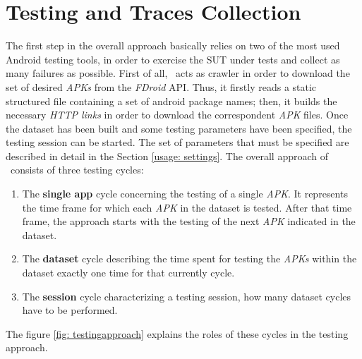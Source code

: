 \section{Testing and Traces Collection}
\label{approach:testing}
The first step in the overall approach basically relies on two of the most used Android testing tools, in order to exercise the SUT under tests and collect as many failures as possible. 
First of all, \toolname\ acts as crawler in order to download the set of desired \textit{APKs} from the \textit{FDroid} API. 
Thus, it firstly reads a static structured file containing a set of android package names; then, it builds the necessary \textit{HTTP links} in order to download the correspondent \textit{APK} files. 
Once the dataset has been built and some testing parameters have been specified, the testing session can be started. 
The set of parameters that must be specified are described in detail in the Section \ref{usage: settings}.
The overall approach of \toolname\ consists of three testing cycles: 
\begin{enumerate}
\item 
The \textbf{single app} cycle concerning the testing of a single \textit{APK}. It represents the time frame for which each \textit{APK} in the dataset is tested. After that time frame, the approach starts with the testing of the next \textit{APK} indicated in the dataset. 
\item The \textbf{dataset} cycle describing the time spent for testing the \textit{APKs} within the dataset exactly one time for that currently cycle. 
\item The \textbf{session} cycle characterizing a testing session, \ie how many dataset cycles have to be performed. 
\end{enumerate}
The figure \ref{fig: testingapproach} explains the roles of these cycles in the testing approach. 
